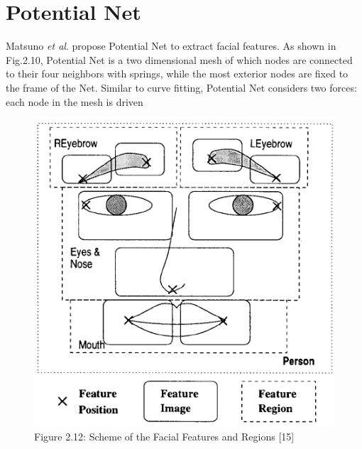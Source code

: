 \documentclass[12pt, twoside]{report}
\begin{document}
	\section{Potential Net}
	\par 
	Matsuno \textit{et al}. \cite{61} \cite{41} propose Potential Net to extract facial features. As shown in Fig.2.10, Potential Net is a two dimensional mesh of which nodes are connected to their four neighbors with springs, while the most exterior nodes are fixed to the frame of the Net. Similar to curve fitting, Potential Net considers two forces: each node in the mesh is driven


	\newpage

	\begin{figure}
		\centering \includegraphics[totalheight=8cm]{img/93_1.png}
		\caption{Figure 2.12: Scheme of the Facial Features and Regions [15]}
		\label{Fig 2.12}
	\end{figure}
\end{document}
